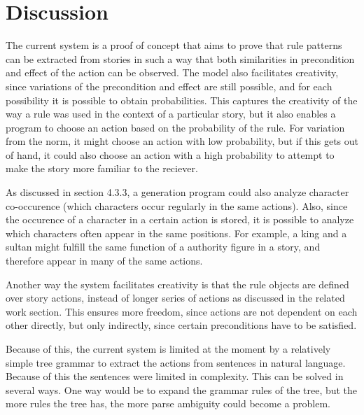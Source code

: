 \section{Discussion}

The current system is a proof of concept that aims to prove that rule patterns
can be extracted from stories in such a way that both similarities in
precondition and effect of the action can be observed. The model also
facilitates creativity, since variations of the precondition and effect are
still possible, and for each possibility it is possible to obtain probabilities.
This captures the creativity of the way a rule was used in the context of a
particular story, but it also enables a program to choose an action based on the
probability of the rule. For variation from the norm, it might choose an action
with low probability, but if
this gets out of hand, it could also choose an action with a high probability to
attempt to make the story more familiar to the reciever.

As discussed in section 4.3.3, a generation program could also analyze character co-occurence
(which characters occur regularly in the same actions). Also, since the
occurence of a character in a certain action is stored, it is possible to
analyze which characters often appear in the same positions.
For example, a king
and a sultan might fulfill the same function of a authority figure in a story,
and therefore appear in many of the same actions.

Another way the system facilitates creativity is that the rule objects are
defined over story actions, instead of longer series of actions as discussed in
the related work section. This ensures more freedom, since actions are not
dependent on each other directly, but only indirectly, since certain
preconditions have to be satisfied.

Because of this, the current
system is limited at the moment by a relatively simple tree grammar to extract
the actions from sentences in natural language. Because of this the sentences
were limited in complexity. This can be solved in several ways. One way would be
to expand the grammar rules of the tree, but the more rules the tree has, the
more parse ambiguity could become a problem.
